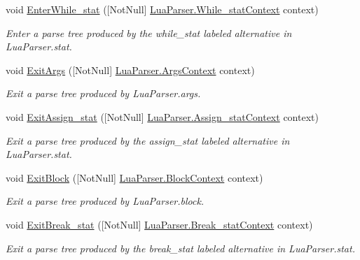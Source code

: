 \begin{DoxyCompactItemize}
void \mbox{\hyperlink{classzlua_1_1_compiler_a353452b5dbe912d06c08a6429be95906}{Enter\+While\+\_\+stat}} (\mbox{[}Not\+Null\mbox{]} \mbox{\hyperlink{classzlua_1_1_lua_parser_1_1_while__stat_context}{Lua\+Parser.\+While\+\_\+stat\+Context}} context)
\begin{DoxyCompactList}\small\item\em Enter a parse tree produced by the {\ttfamily while\+\_\+stat} labeled alternative in Lua\+Parser.\+stat. \end{DoxyCompactList}\item 
void \mbox{\hyperlink{classzlua_1_1_compiler_ae35672ab6cc512e4dab4ddc9063d9f22}{Exit\+Args}} (\mbox{[}Not\+Null\mbox{]} \mbox{\hyperlink{classzlua_1_1_lua_parser_1_1_args_context}{Lua\+Parser.\+Args\+Context}} context)
\begin{DoxyCompactList}\small\item\em Exit a parse tree produced by Lua\+Parser.\+args. \end{DoxyCompactList}\item 
void \mbox{\hyperlink{classzlua_1_1_compiler_a122e9a6b8770d627e6461baee20fcf62}{Exit\+Assign\+\_\+stat}} (\mbox{[}Not\+Null\mbox{]} \mbox{\hyperlink{classzlua_1_1_lua_parser_1_1_assign__stat_context}{Lua\+Parser.\+Assign\+\_\+stat\+Context}} context)
\begin{DoxyCompactList}\small\item\em Exit a parse tree produced by the {\ttfamily assign\+\_\+stat} labeled alternative in Lua\+Parser.\+stat. \end{DoxyCompactList}\item 
void \mbox{\hyperlink{classzlua_1_1_compiler_a75376c8d84a2bb594e2fab53270000fb}{Exit\+Block}} (\mbox{[}Not\+Null\mbox{]} \mbox{\hyperlink{classzlua_1_1_lua_parser_1_1_block_context}{Lua\+Parser.\+Block\+Context}} context)
\begin{DoxyCompactList}\small\item\em Exit a parse tree produced by Lua\+Parser.\+block. \end{DoxyCompactList}\item 
void \mbox{\hyperlink{classzlua_1_1_compiler_a6d60d0ca6f6c6c85d7ed31f0e7e8514d}{Exit\+Break\+\_\+stat}} (\mbox{[}Not\+Null\mbox{]} \mbox{\hyperlink{classzlua_1_1_lua_parser_1_1_break__stat_context}{Lua\+Parser.\+Break\+\_\+stat\+Context}} context)
\begin{DoxyCompactList}\small\item\em Exit a parse tree produced by the {\ttfamily break\+\_\+stat} labeled alternative in Lua\+Parser.\+stat. \end{DoxyCompactList}\item 

\end{DoxyCompactItemize}
